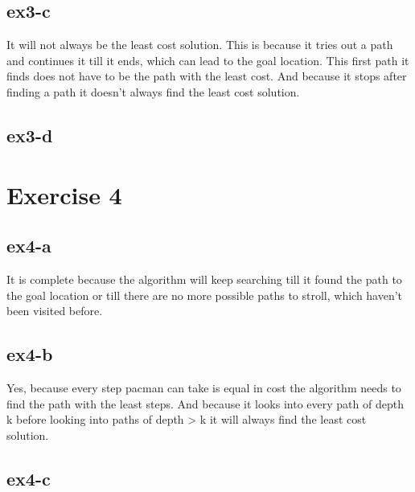 \documentclass[a4paper]{article}
\begin{document}
\subsection{ex3-c}
It will not always be the least cost solution. This is because it tries out a path and continues it till it ends, which can
lead to the goal location. This first path it finds does not have to be the path with the least cost. 
And because it stops after finding a path it doesn't always find the least cost solution.

\subsection{ex3-d}



\section{Exercise 4}
\subsection{ex4-a}
It is complete because the algorithm will keep searching till it found the path to the goal location or till there are no more 
possible paths to stroll, which haven't been visited before.

\subsection{ex4-b}
Yes, because every step pacman can take is equal in cost the algorithm needs to find the path with the least steps.
And because it looks into every path of depth k before looking into paths of depth > k it will 
always find the least cost solution.

\subsection{ex4-c}
\end{document}
